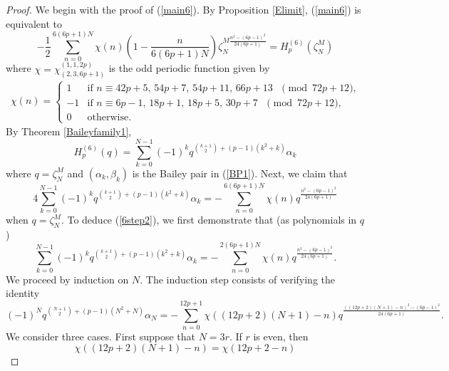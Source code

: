\documentclass[11pt,reqno]{amsart}
\theoremstyle{definition}
\numberwithin{equation}{section}
\renewcommand{\=}{\;=\;}
\begin{document}
\begin{proof} We begin with the proof of (\ref{main6}). By Proposition \ref{Elimit}, (\ref{main6}) is equivalent to
\begin{equation} \label{6step0}
-\frac{1}{2} \sum_{n=0}^{6(6p+1)N} \chi(n) \left( 1 - \frac{n}{6(6p+1)N} \right) \zeta_N^{M \frac{n^2 - (6p-1)^2}{24(6p+1)}} = H_{p}^{(6)}(\zeta_N^{M}) 
\end{equation}
where $\chi = \chi_{(2,3,6p+1)}^{(1,1,2p)}$ is the odd periodic function given by 
\begin{eqnarray} \label{chi23}
\chi(n) = 
\begin{cases}
1 & \text{if $n \equiv 42p+5$, $54p+7$, $54p+11$, $66p+13$ $\pmod{72p+12}$,} \\
-1 & \text{if $n \equiv 6p-1$, $18p+1$, $18p+5$, $30p+7$ $\pmod{72p+12}$,}\\
0 & \text{otherwise.}
\end{cases}
\end{eqnarray}
By Theorem \ref{Baileyfamily1},
\begin{equation} \label{6step1}
H_{p}^{(6)}(q) = \sum_{k=0}^{N-1} (-1)^k q^{\binom{k+1}{2} + (p-1)(k^2 + k)} \alpha_k
\end{equation}
where $q=\zeta_N^{M}$ and $(\alpha_k, \beta_k)$ is the Bailey pair in (\ref{BP1}). Next, we claim that
\begin{equation} \label{6step2}
4 \sum_{k=0}^{N-1} (-1)^k q^{\binom{k+1}{2} + (p-1)(k^2 + k)} \alpha_k = - \sum_{n=0}^{6(6p+1)N} \chi(n) q^{\frac{n^2 - (6p-1)^2}{24(6p+1)}}
\end{equation}
when $q=\zeta_N^{M}$. To deduce (\ref{6step2}), we first demonstrate that (as polynomials in $q$)
\begin{equation} \label{6step3}
\sum_{k=0}^{N-1} (-1)^k q^{\binom{k+1}{2} + (p-1)(k^2 + k)} \alpha_k = - \sum_{n=0}^{2(6p+1)N} \chi(n) q^{\frac{n^2 - (6p-1)^2}{24(6p+1)}}.
\end{equation}
We proceed by induction on $N$. The induction step consists of verifying the identity
\begin{equation} \label{6step4}
(-1)^N q^{\binom{N+1}{2} + (p-1)(N^2 + N)} \alpha_N = -\sum_{n=0}^{12p+1} \chi((12p+2)(N+1) - n) q^{\frac{((12p+2)(N+1) - n)^2 - (6p-1)^2}{24(6p+1)}}.
\end{equation}
We consider three cases.  First suppose that $N=3r$. If $r$ is even, then 
\begin{equation*} \label{6step5}
\chi((12p+2)(N+1) - n) = \chi(12p+2-n)
\end{equation*}

\end{proof}
\end{document}

